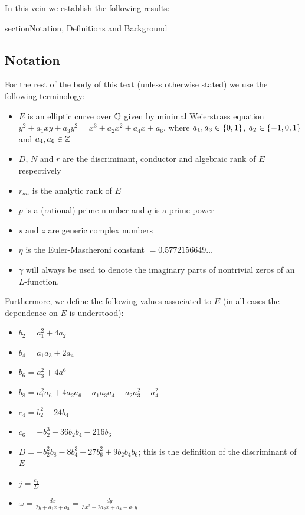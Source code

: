 \documentclass[10pt]{article}
\begin{document}
In this vein we establish the following results:


\newpage
section{Notation, Definitions and Background}\label{sec:defs_background}

\subsection{Notation}

For the rest of the body of this text (unless otherwise stated) we use the following terminology:
\begin{itemize}
\item $E$ is an elliptic curve over $\mathbb{Q}$ given by minimal Weierstrass equation $y^2 + a_1 xy + a_3 y^2 = x^3 + a_2 x^2 + a_4 x + a_6$, where $a_1, a_3 \in \left\{0,1\right\}$, $a_2 \in \left\{-1,0,1\right\}$ and $a_4,a_6 \in \mathbb{Z}$
\item $D$, $N$ and $r$ are the discriminant, conductor and algebraic rank of $E$ respectively
\item $r_{an}$ is the analytic rank of $E$
\item $p$ is a (rational) prime number and $q$ is a prime power
\item $s$ and $z$ are generic complex numbers
\item $\eta$ is the Euler-Mascheroni constant $= 0.5772156649\ldots$
\item $\gamma$ will always be used to denote the imaginary parts of nontrivial zeros of an $L$-function. \\
\end{itemize}

Furthermore, we define the following values associated to $E$ (in all cases the dependence on $E$ is understood):
\begin{itemize}
\item $b_2 = a_1^2 + 4a_2$
\item $b_4 = a_1 a_3 + 2a_4$
\item $b_6 = a_3^2 + 4a^6$
\item $b_8 = a_1^2 a_6 + 4 a_2 a_6 - a_1 a_3 a_4 + a_2 a_3^2 - a_4^2$
\item $c_4 = b_2^2 - 24 b_4$
\item $c_6 = -b_2^3 + 36 b_2 b_4  - 216 b_6$
\item $D = -b_2^2 b_8 - 8 b_4^3 - 27 b_6^2 + 9 b_2 b_4 b_6$; this is the definition of the discriminant of $E$
\item $j = \frac{c_4}{D}$
\item $\omega = \frac{dx}{2y + a_1 x + a_3} = \frac{dy}{3x^2 + 2a_2 x + a_4 - a_1 y}$
\end{itemize}
\end{document}

